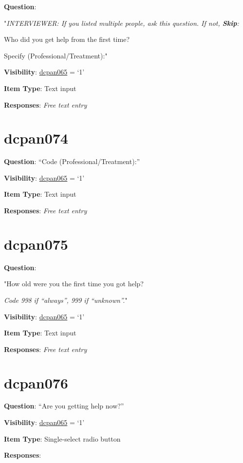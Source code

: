 \documentclass[]{book}
\begin{document}
\textbf{Question}:

"\emph{INTERVIEWER: If you listed multiple people, ask this question. If not, \textbf{Skip}:}

Who did you get help from the first time?

Specify (Professional/Treatment):"

\textbf{Visibility}: \protect\hyperlink{dcpan065}{dcpan065} = `1'

\textbf{Item Type}: Text input

\textbf{Responses}: \emph{Free text entry}

\hypertarget{dcpan074}{%
\section{dcpan074}\label{dcpan074}}

\textbf{Question}: ``Code (Professional/Treatment):''

\textbf{Visibility}: \protect\hyperlink{dcpan065}{dcpan065} = `1'

\textbf{Item Type}: Text input

\textbf{Responses}: \emph{Free text entry}

\hypertarget{dcpan075}{%
\section{dcpan075}\label{dcpan075}}

\textbf{Question}:

"How old were you the first time you got help?

\emph{Code 998 if ``always'', 999 if ``unknown''.}"

\textbf{Visibility}: \protect\hyperlink{dcpan065}{dcpan065} = `1'

\textbf{Item Type}: Text input

\textbf{Responses}: \emph{Free text entry}

\hypertarget{dcpan076}{%
\section{dcpan076}\label{dcpan076}}

\textbf{Question}: ``Are you getting help now?''

\textbf{Visibility}: \protect\hyperlink{dcpan065}{dcpan065} = `1'

\textbf{Item Type}: Single-select radio button

\textbf{Responses}:
\end{document}
